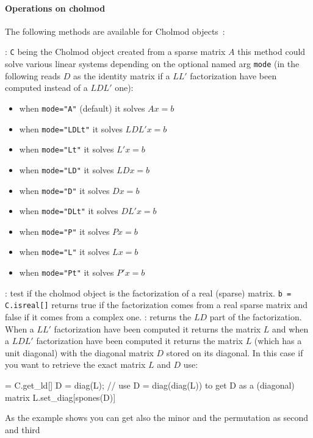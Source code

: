 \paragraph{Operations on cholmod}
The following methods are available for Cholmod objects~:
\begin{varlist}
  : \verb+C+ being the Cholmod object created from a sparse matrix $A$
  this method could solve various linear systems depending on the optional named arg \verb+mode+ (in the
  following reads $D$ as the identity matrix if a $LL'$ factorization have been computed instead of a  
  $LDL'$ one):
     \begin{itemize} 
        \item when \verb+mode="A"+ (default) it solves $Ax=b$ 
        \item when \verb+mode="LDLt"+ it solves $LDL' x = b$
        \item when \verb+mode="Lt"+ it solves $L' x = b$  
        \item when \verb+mode="LD"+ it solves $LD x = b$
        \item when \verb+mode="D"+ it solves $D x = b$
        \item when \verb+mode="DLt"+ it solves $DL' x = b$
        \item when \verb+mode="P"+ it solves $P x = b$
        \item when \verb+mode="L"+ it solves $L x = b$
        \item when \verb+mode="Pt"+ it solves $P' x = b$
     \end{itemize}
  : test if the cholmod object is the factorization of a real (sparse) matrix.
                  \verb+b = C.isreal[]+ returns true if the factorization comes from a real
                  sparse matrix and false if it comes from a complex one.
  : returns the $LD$ part of the factorization. When a $LL'$
        factorization have been computed  it returns the matrix $L$ and when a $LDL'$
        factorization have been computed it returns the matrix $L$ (which has a unit diagonal) with
        the diagonal matrix $D$ stored on its diagonal. In this case if you want to retrieve
        the exact matrix $L$ and $D$ use:
        \begin{nspcode}
        [L,m,p] = C.get_ld[]
        D = diag(L);  // use D = diag(diag(L)) to get D as a (diagonal) matrix 
        L.set_diag[spones(D)]
        \end{nspcode}
        As the example shows you can get also the minor and the permutation as second and third

\end{varlist}
